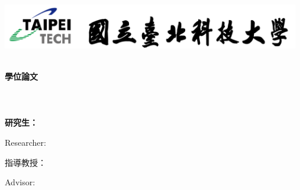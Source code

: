 \begin{titlepage}
    \newpage
    \begin{center}
        \includegraphics[width=13cm]{ntut-logo-with-label.png}

        \huge\bf\deptCname\\%
        \huge\bf\degreeCname 學位論文\\%
        \huge\Large\fulldeptEname\\%
        \huge\Large\degreeEname\\ %

        \vfill
        \LARGE\bf\eTitle\\ %

        \vfill
        {\Large 研究生：\myCname}

        {\Large Researcher: \myEname}

        \vfill
        {\Large 指導教授：\advisorCname}

        {\Large Advisor: \advisorEname}

        \vfill
        {\Large \eMonth \space \eYear}
    \end{center}
\end{titlepage}